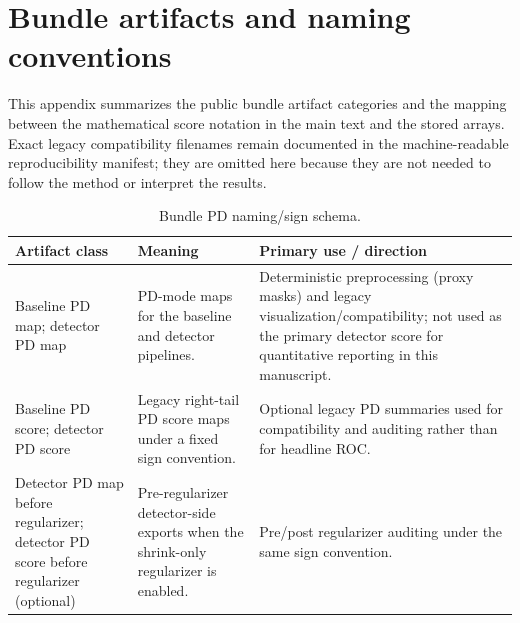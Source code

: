 \section{Bundle artifacts and naming conventions}
\label{app:bundle-schema}

This appendix summarizes the public bundle artifact categories and the mapping between the mathematical score notation in the main text and the stored arrays. Exact legacy compatibility filenames remain documented in the machine-readable reproducibility manifest; they are omitted here because they are not needed to follow the method or interpret the results.

\begin{table}[t]
\centering
\small
\begingroup
\setlength{\tabcolsep}{4pt}
\begin{tabular}{@{}P{4.1cm} P{6.8cm} P{4.4cm}@{}}
\hline
Artifact class & Meaning & Primary use / direction \\
\hline
Baseline PD map; detector PD map & PD-mode maps for the baseline and detector pipelines. & Deterministic preprocessing (proxy masks) and legacy visualization/compatibility; not used as the primary detector score for quantitative reporting in this manuscript. \\
Baseline PD score; detector PD score & Legacy right-tail PD score maps under a fixed sign convention. & Optional legacy PD summaries used for compatibility and auditing rather than for headline ROC. \\
Detector PD map before regularizer; detector PD score before regularizer (optional) & Pre-regularizer detector-side exports when the shrink-only regularizer is enabled. & Pre/post regularizer auditing under the same sign convention. \\
\hline
\end{tabular}
\endgroup
\caption{Bundle PD naming/sign schema.}
\label{tab:pd_bundle_schema}
\end{table}

